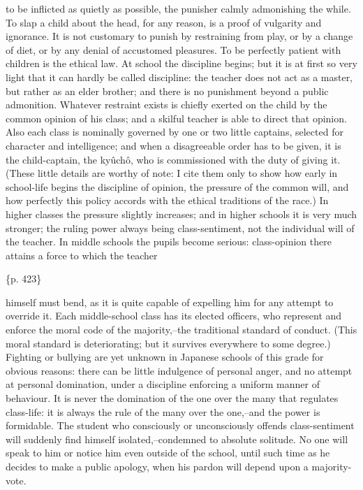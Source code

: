 to be inflicted as quietly as possible, the punisher calmly admonishing the while. To slap a child about the head, for any reason, is a proof of vulgarity and ignorance. It is not customary to punish by restraining from play, or by a change of diet, or by any denial of accustomed pleasures. To be perfectly patient with children is the ethical law. At school the discipline begins; but it is at first so very light that it can hardly be called discipline: the teacher does not act as a master, but rather as an elder brother; and there is no punishment beyond a public admonition. Whatever restraint exists is chiefly exerted on the child by the common opinion of his class; and a skilful teacher is able to direct that opinion. Also each class is nominally governed by one or two little captains, selected for character and intelligence; and when a disagreeable order has to be given, it is the child-captain, the kyûchô, who is commissioned with the duty of giving it. (These little details are worthy of note: I cite them only to show how early in school-life begins the discipline of opinion, the pressure of the common will, and how perfectly this policy accords with the ethical traditions of the race.) In higher classes the pressure slightly increases; and in higher schools it is very much stronger; the ruling power always being class-sentiment, not the individual will of the teacher. In middle schools the pupils become serious: class-opinion there attains a force to which the teacher

\{p. 423\}

himself must bend, as it is quite capable of expelling him for any attempt to override it. Each middle-school class has its elected officers, who represent and enforce the moral code of the majority,--the traditional standard of conduct. (This moral standard is deteriorating; but it survives everywhere to some degree.) Fighting or bullying are yet unknown in Japanese schools of this grade for obvious reasons: there can be little indulgence of personal anger, and no attempt at personal domination, under a discipline enforcing a uniform manner of behaviour. It is never the domination of the one over the many that regulates class-life: it is always the rule of the many over the one,--and the power is formidable. The student who consciously or unconsciously offends class-sentiment will suddenly find himself isolated,--condemned to absolute solitude. No one will speak to him or notice him even outside of the school, until such time as he decides to make a public apology, when his pardon will depend upon a majority-vote.


